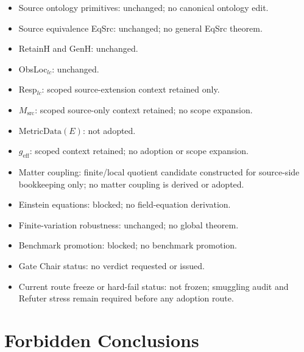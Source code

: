 \begin{itemize}
  \item Source ontology primitives: unchanged; no canonical ontology edit.
  \item Source equivalence EqSrc: unchanged; no general EqSrc theorem.
  \item RetainH and GenH: unchanged.
  \item ObsLoc\(_{lc}\): unchanged.
  \item Resp\(_{lc}\): scoped source-extension context retained only.
  \item \(M_{\mathrm{src}}\): scoped source-only context retained; no scope
    expansion.
  \item \(\mathrm{MetricData}(E)\): not adopted.
  \item \(g_{\mathrm{eff}}\): scoped context retained; no adoption or scope
    expansion.
  \item Matter coupling: finite/local quotient candidate constructed for
    source-side bookkeeping only; no matter coupling is derived or adopted.
  \item Einstein equations: blocked; no field-equation derivation.
  \item Finite-variation robustness: unchanged; no global theorem.
  \item Benchmark promotion: blocked; no benchmark promotion.
  \item Gate Chair status: no verdict requested or issued.
  \item Current route freeze or hard-fail status: not frozen; smuggling audit
    and Refuter stress remain required before any adoption route.
\end{itemize}

\section{Forbidden Conclusions}

